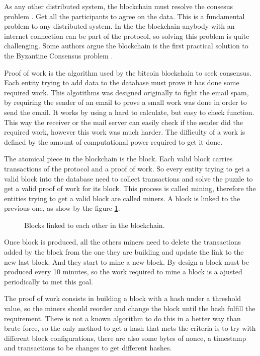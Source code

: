 As any other distributed system, the blockchain must resolve the consesus
  problem \cite{fischer1983consensus}. Get all the participants to agree on
  the data. This is a fundamental problem to any distributed system. In the
  the blockchain anybody with an internet connection can be part of the
  protocol, so solving this problem is quite challenging. Some authors argue
  the blockchain is the first practical solution to the Byzantine Consensus
  problem \cite{miller2014anonymous} \cite{sun2014solving}.

Proof of work is the algorithm used by the bitcoin blockchain to seek
  consensus. Each entity trying to add data to the database must prove it
  has done some required work. This algotithms was designed originally to
  fight the email spam, by requiring the sender of an email to prove a small
  work was done in order to send the email\cite{dwork1992pricing}.
It works by using a hard to calculate, but easy to check function. This
  way the receiver or the mail server can easily check if the sender did
  the required work, however this work was much harder. The difficulty of
  a work is defined by the amount of computational power required to get
  it done.

The atomical piece in the blockchain is the block. Each valid block carries
  transactions of the protocol and a proof of work. So every entity trying to
  get a valid block into the database need to collect transactions and solve
  the puzzle to get a valid proof of work for its block.
This process is called mining, therefore the entities trying to get a valid
  block are called miners. A block is linked to the previous one, as show by the
  figure \ref{fig:block_links}.

\begin{figure}
	\centering
	\def\svgwidth{\columnwidth}
	
	\caption{Blocks linked to each other in the blockchain.}
	\label{fig:block_links}
\end{figure}

Once block is produced, all the others miners need to delete the transactions
  added by the block from the one they are building and update the link to the
  new last block. And they start to mine a new block.
By design a block must be produced every 10 minutes, so the work required to
  mine a block is a ajusted periodically to met this goal.

The proof of work consists in building a block with a hash under a threshold
  value, so the miners should reorder and change the block until the hash
  fulfill the requirement. There is not a known algorithm to do this in a
  better way than brute force, so the only method to get a hash that mets the
  criteria is to try with different block configurations, there are also some
  bytes of nonce, a timestamp and transactions to be changes to get different
  hashes.

